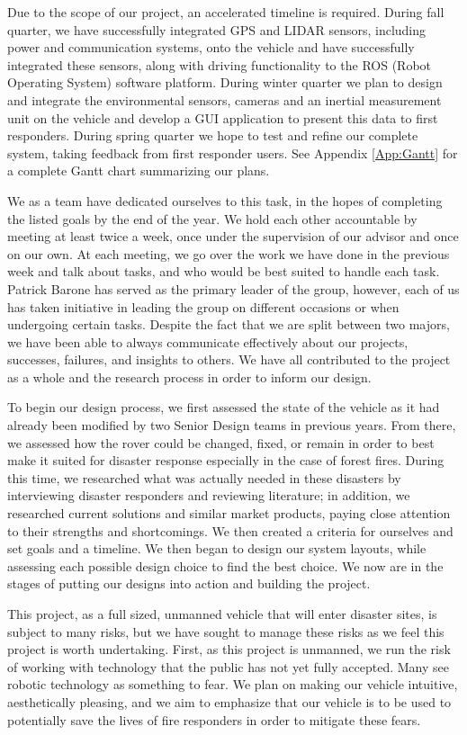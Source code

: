 Due to the scope of our project, an accelerated timeline is required. During fall quarter, we have successfully integrated GPS and LIDAR sensors, including power and communication systems, onto the vehicle and have successfully integrated these sensors, along with driving functionality to the ROS (Robot Operating System) software platform. During winter quarter we plan to design and integrate the environmental sensors, cameras and an inertial measurement unit on the vehicle and develop a GUI application to present this data to first responders. During spring quarter we hope to test and refine our complete system, taking feedback from first responder users. See Appendix \ref{App:Gantt} for a complete Gantt chart summarizing our plans. 

We as a team have dedicated ourselves to this task, in the hopes of completing the listed goals by the end of the year. We hold each other accountable by meeting at least twice a week, once under the supervision of our advisor and once on our own. At each meeting, we go over the work we have done in the previous week and talk about tasks, and who would be best suited to handle each task. Patrick Barone has served as the primary leader of the group, however, each of us has taken initiative in leading the group on different occasions or when undergoing certain tasks. Despite the fact that we are split between two majors, we have been able to always communicate effectively about our projects, successes, failures, and insights to others. We have all contributed to the project as a whole and the research process in order to inform our design. 

To begin our design process, we first assessed the state of the vehicle as it had already been modified by two Senior Design teams in previous years. From there, we assessed how the rover could be changed, fixed, or remain in order to best make it suited for disaster response especially in the case of forest fires. During this time, we researched what was actually needed in these disasters by interviewing disaster responders and reviewing literature; in addition, we researched current solutions and similar market products, paying close attention to their strengths and shortcomings. We then created a criteria for ourselves and set goals and a timeline. We then began to design our system layouts, while assessing each possible design choice to find the best choice. We now are in the stages of putting our designs into action and building the project. 

This project, as a full sized, unmanned vehicle that will enter disaster sites, is subject to many risks, but we have sought to manage these risks as we feel this project is worth undertaking. First, as this project is unmanned, we run the risk of working with technology that the public has not yet fully accepted. Many see robotic technology as something to fear. We plan on making our vehicle intuitive, aesthetically pleasing, and we aim to emphasize that our vehicle is to be used to potentially save the lives of fire responders in order to mitigate these fears. 

